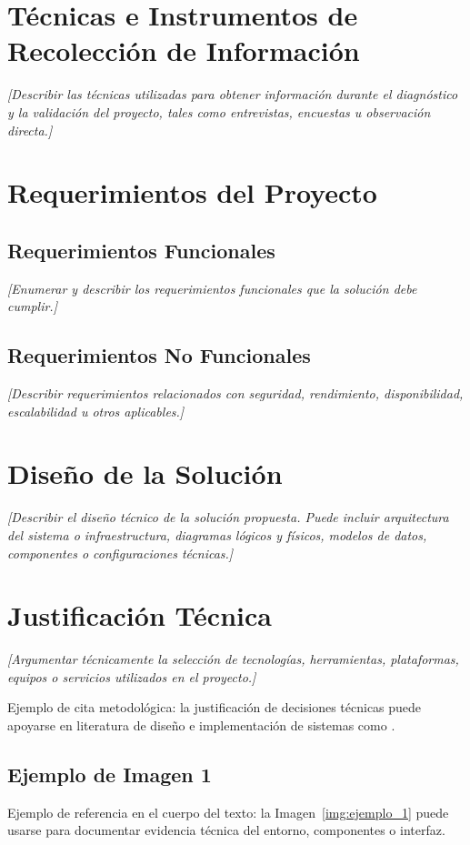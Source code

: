\section{Técnicas e Instrumentos de Recolección de Información}
\textit{[Describir las técnicas utilizadas para obtener información durante el diagnóstico y la validación del proyecto, tales como entrevistas, encuestas u observación directa.]}

\section{Requerimientos del Proyecto}
\subsection{Requerimientos Funcionales}
\textit{[Enumerar y describir los requerimientos funcionales que la solución debe cumplir.]}
\subsection{Requerimientos No Funcionales}
\textit{[Describir requerimientos relacionados con seguridad, rendimiento, disponibilidad, escalabilidad u otros aplicables.]}

\section{Diseño de la Solución}
\label{sec:diseno_solucion}
\textit{[Describir el diseño técnico de la solución propuesta. Puede incluir arquitectura del sistema o infraestructura, diagramas lógicos y físicos, modelos de datos, componentes o configuraciones técnicas.]}

\section{Justificación Técnica}
\textit{[Argumentar técnicamente la selección de tecnologías, herramientas, plataformas, equipos o servicios utilizados en el proyecto.]}

Ejemplo de cita metodológica: la justificación de decisiones técnicas puede apoyarse en literatura de diseño e implementación de sistemas como \cite{hevner2004design,humble2011devops}.

\subsection{Ejemplo de Imagen 1}
Ejemplo de referencia en el cuerpo del texto: la Imagen~\ref{img:ejemplo_1} puede usarse para documentar evidencia técnica del entorno, componentes o interfaz.

